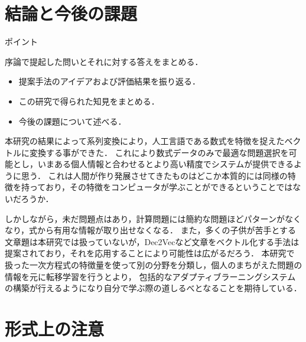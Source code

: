 \documentclass[a4j,11pt,report]{jsbook}
\newcommand{\point}[1]{
\begin{itembox}[l]{ポイント}
  #1
\end{itembox}
}
\begin{document}
\chapter{結論と今後の課題 \label{ch:conclusion}}
\point{
序論で提起した問いとそれに対する答えをまとめる．
\begin{itemize}
  \item 提案手法のアイデアおよび評価結果を振り返る．
  \item この研究で得られた知見をまとめる．
  \item 今後の課題について述べる．
\end{itemize}
}
\fi

本研究の結果によって系列変換により，人工言語である数式を特徴を捉えたベクトルに変換する事ができた．
これにより数式データのみで最適な問題選択を可能とし，いまある個人情報と合わせるとより高い精度でシステムが提供できるように思う．
これは人間が作り発展させてきたものはどこか本質的には同様の特徴を持っており，その特徴をコンピュータが学ぶことができるということではないだろうか．

しかしながら，未だ問題点はあり，計算問題には簡約な問題ほどパターンがなくなり，式から有用な情報が取り出せなくなる．
また，多くの子供が苦手とする文章題は本研究では扱っていないが，Dec2Vecなど文章をベクトル化する手法は提案されており，それを応用することにより可能性は広がるだろう．
本研究で扱った一次方程式の特徴量を使って別の分野を分類し，個人のまちがえた問題の情報を元に転移学習を行うとより，
包括的なアダプティブラーニングシステムの構築が行えるようになり自分で学ぶ際の道しるべとなることを期待している．



\chapter{形式上の注意}
\end{document}
